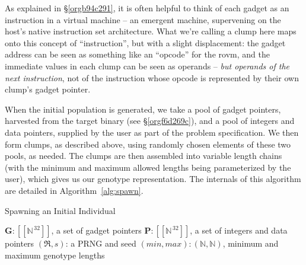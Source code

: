 \documentclass[12pt,glossary]{dalthesis}
\begin{document}
As explained in \S \ref{orgb94c291}, it is often helpful to think of
each gadget as an instruction in a virtual machine -- an emergent machine,
supervening on the host's native instruction set architecture. What we're
calling a clump here maps onto this concept of ``instruction'', but with a
slight displacement: the gadget address can be seen as something
like an ``opcode'' for the \gls{rovm}, and the immediate values in each clump
can be seen as operands -- \emph{but operands of the next instruction}, not of
the instruction whose opcode is represented by their own clump's gadget
pointer.

When the initial population is generated, we take a pool of gadget pointers, 
harvested from the target binary (see \S \ref{orgf6d269c}), and a
pool of integers and data pointers, supplied by the user as part of the problem
specification. We then form clumps, as described above, using randomly chosen
elements of these two pools, as needed. The clumps are then assembled into 
variable length chains (with the minimum and maximum allowed lengths being
parameterized by the user), which gives us our genotype representation. The
internals of this algorithm are detailed in Algorithm~\ref{alg:spawn}.

\begin{algorithm}
\caption{Spawning an Initial Individual}
\label{alg:spawn}
\begin{algorithmic}[1]
\REQUIRE $\mathbf{G}: [\![\mathbb{N}^{\,32}]\!]$, a set of gadget pointers
\REQUIRE $\mathbf{P}: [\![\mathbb{N}^{\,32}]\!]$, a set of integers and data pointers
\REQUIRE $(\mathfrak{R}, s)$: a PRNG and seed
\REQUIRE $(min, max): (\mathbb{N}, \mathbb{N})$, minimum and maximum genotype lengths
 
    \ENDFOR
\ENDFOR
\RETURN {$\Gamma$}
\end{algorithmic}
\end{algorithm}
\end{document}

